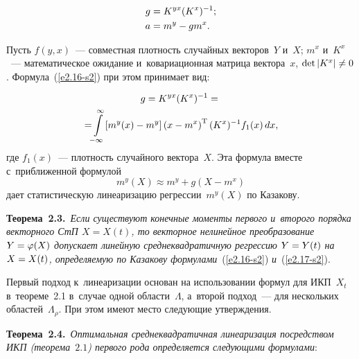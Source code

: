 \begin{multicols}{2}
     \noindent
\begin{align}
      g&=K^{yx} (K^x)^{-1};     \label{e2.16-s2}\\ 
      a&=m^y-gm^x.\notag
\end{align}

\vspace*{-2pt}


Пусть $f(y,x)$~--- совместная плотность случайных векторов~$Y$ и~$X$; $m^x$ 
и~$K^x$~--- математическое ожидание и~ковариационная матрица вектора~$x$, $\mathrm{det}\,|K^x |\hm\ne 0$.  
Формула~(\ref{e2.16-s2}) при этом принимает вид:

\vspace*{-4pt}

\noindent
        \begin{multline}
    g=K^{yx} (K^x)^{-1} ={}\\
\!\!{}=\!\!\int\limits_{-\infty}^\infty \!\left[ m^y(x) - m^y\right] \left(x-m^x\right)^{\mathrm{T}} (K^x)^{-1} f_1 (x) \,dx,\!
    \label{e2.17-s2}
        \end{multline}
где  $f_1(x)$~--- плотность случайного вектора~$X$. Эта формула вместе с~приближенной формулой
        \begin{equation*}
    m^y(X) \approx m^y +g\left(X-m^x\right)
        \end{equation*}
дает статистическую линеаризацию регрессии~$m^y(X)$ по Казакову.

\smallskip

\noindent
\textbf{Теорема~2.3.}\ \textit{Если существуют конечные моменты первого и~второго порядка векторного СтП 
$X=X(t)$, то векторное нелинейное преобразование $Y\hm=\varphi(X)$ допускает линейную 
среднеквадратичную регрессию $Y\hm=Y(t)$ на $X\hm=X(t)$, определяемую по Казакову 
формулами}~(\ref{e2.16-s2}) \textit{и}~(\ref{e2.17-s2}).

\smallskip

Первый подход к~линеаризации основан на использовании формул для ИКП~$X_t$ 
в~тео\-ре\-ме~2.1 в~случае одной об\-ласти~$\Lambda$, а~второй подход~--- для нескольких 
областей~$\Lambda_\rho$. При этом имеют место сле\-ду\-ющие утверж\-де\-ния.

\smallskip

\noindent
\textbf{Теорема~2.4.}\ \textit{Оптимальная среднеквадратичная линеаризация посредством ИКП (тео\-ре\-ма~$2.1$) 
первого рода определяется сле\-ду\-ющи\-ми формулами}:

\vspace*{-4pt}


\end{multicols}
